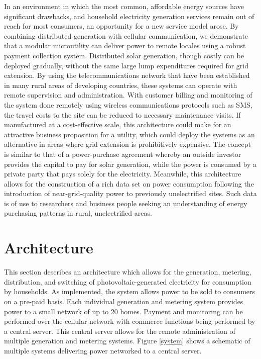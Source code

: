 \documentclass{sig-alternate}
\begin{document}
In an environment in which the most common, affordable energy sources
have significant drawbacks, and household electricity generation
services remain out of reach for most consumers, an opportunity for a
new service model arose.
By combining distributed generation with cellular communication, we
demonstrate that a modular microutility can deliver power to remote
locales using a robust payment collection system.
Distributed solar generation, though costly can be deployed gradually,
without the same large lump expenditures required for grid extension.
By using the telecommunications network that have been established in
many rural areas of developing countries, these systems can operate with
remote supervision and administration.
With customer billing and monitoring of the system done remotely
using wireless communications protocols such as SMS, the travel costs
to the site can be reduced to necessary maintenance visits.
If manufactured at a cost-effective scale, this architecture could make
for an attractive business proposition for a utility, which could deploy
the systems as an alternative in areas where grid extension is
prohibitively expensive.
The concept is similar to that of a power-purchase agreement whereby an
outside investor provides the capital to pay for solar generation, while
the power is consumed by a private party that pays solely for the
electricity.
Meanwhile, this architecture allows for the construction of a rich data
set on power consumption following the introduction of near-grid-quality
power to previously unelectrified sites.
Such data is of use to researchers and business people seeking an
understanding of energy purchasing patterns in rural, unelectrified
areas.


\section{Architecture}

This section describes an architecture which allows for the generation,
metering, distribution, and switching of photovoltaic-generated electricity for
consumption by households.
As implemented, the system allows power to be sold to consumers on a
pre-paid basis.
Each individual generation and metering system provides power to a small
network of up to 20 homes.
Payment and monitoring can be performed over the cellular network with commerce
functions being performed by a central server.
This central server allows for the remote administration of multiple generation
and metering systems.
Figure \ref{system} shows a schematic of multiple systems delivering power
networked to a central server.
\end{document}
